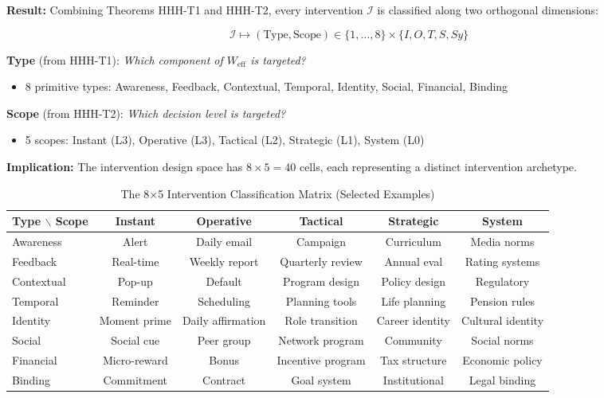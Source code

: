 \begin{tcolorbox}[colback=orange!5!white, colframe=orange!75!black,
    title=\textbf{The Two-Dimensional Intervention Classification}]

\textbf{Result:} Combining Theorems HHH-T1 and HHH-T2, every intervention $\mathcal{I}$ is classified along two orthogonal dimensions:

\begin{equation}
\boxed{\mathcal{I} \mapsto (\text{Type}, \text{Scope}) \in \{1, \ldots, 8\} \times \{I, O, T, S, Sy\}}
\label{eq:hhh-2d-classification}
\end{equation}

\textbf{Type} (from HHH-T1): \textit{Which component of $W_{\text{eff}}$ is targeted?}
\begin{itemize}[nosep]
    \item 8 primitive types: Awareness, Feedback, Contextual, Temporal, Identity, Social, Financial, Binding
\end{itemize}

\textbf{Scope} (from HHH-T2): \textit{Which decision level is targeted?}
\begin{itemize}[nosep]
    \item 5 scopes: Instant (L3), Operative (L3), Tactical (L2), Strategic (L1), System (L0)
\end{itemize}

\textbf{Implication:} The intervention design space has $8 \times 5 = 40$ cells, each representing a distinct intervention archetype.

\end{tcolorbox}

\begin{table}[htbp]
\centering
\caption{The 8×5 Intervention Classification Matrix (Selected Examples)}
\label{tab:hhh-matrix}
\renewcommand{\arraystretch}{1.2}
\small
\begin{tabular}{@{}l|ccccc@{}}
\toprule
\textbf{Type $\backslash$ Scope} & \textbf{Instant} & \textbf{Operative} & \textbf{Tactical} & \textbf{Strategic} & \textbf{System} \\
\midrule
Awareness & Alert & Daily email & Campaign & Curriculum & Media norms \\
Feedback & Real-time & Weekly report & Quarterly review & Annual eval & Rating systems \\
Contextual & Pop-up & Default & Program design & Policy design & Regulatory \\
Temporal & Reminder & Scheduling & Planning tools & Life planning & Pension rules \\
Identity & Moment prime & Daily affirmation & Role transition & Career identity & Cultural identity \\
Social & Social cue & Peer group & Network program & Community & Social norms \\
Financial & Micro-reward & Bonus & Incentive program & Tax structure & Economic policy \\
Binding & Commitment & Contract & Goal system & Institutional & Legal binding \\
\bottomrule
\end{tabular}
\end{table}

